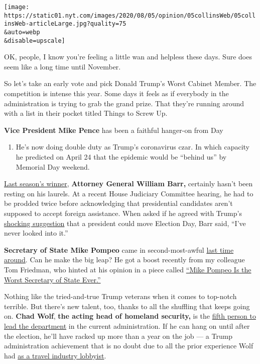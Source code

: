 \texttt{[image: https://static01.nyt.com/images/2020/08/05/opinion/05collinsWeb/05collinsWeb-articleLarge.jpg?quality=75\\\&auto=webp\\\&disable=upscale]}

OK, people, I know you're feeling a little wan and helpless these days.
Sure does seem like a long time until November.

So let's take an early vote and pick Donald Trump's Worst Cabinet
Member. The competition is intense this year. Some days it feels as if
everybody in the administration is trying to grab the grand prize. That
they're running around with a list in their pocket titled Things to
Screw Up.

\textbf{Vice President} \textbf{Mike Pence} has been a faithful
hanger-on from Day

\begin{enumerate}
\def\labelenumi{\arabic{enumi}.}
\tightlist
\item
  He's now doing double duty as Trump's coronavirus czar. In which
  capacity he predicted on April 24 that the epidemic would be ``behind
  us'' by Memorial Day weekend.
\end{enumerate}

\href{https://www.nytimes.com/2019/10/30/opinion/trump-cabinet-worst.html}{Last
season's winner}, \textbf{Attorney General William Barr,} certainly
hasn't been resting on his laurels. At a recent House Judiciary
Committee hearing, he had to be prodded twice before acknowledging that
presidential candidates aren't supposed to accept foreign assistance.
When asked if he agreed with Trump's
\href{https://www.nytimes.com/2020/07/30/us/elections/biden-vs-trump.html}{shocking
suggestion} that a president could move Election Day, Barr said, ``I've
never looked into it.''

\textbf{Secretary of State Mike Pompeo} came in second-most-awful
\href{https://www.nytimes.com/2019/10/30/opinion/trump-cabinet-worst.html}{last
time around}. Can he make the big leap? He got a boost recently from my
colleague Tom Friedman, who hinted at his opinion in a piece called
\href{https://www.nytimes.com/2020/05/26/opinion/mike-pompeo.html}{``Mike
Pompeo Is the Worst Secretary of State Ever.''}

Nothing like the tried-and-true Trump veterans when it comes to
top-notch terrible. But there's new talent, too, thanks to all the
shuffling that keeps going on. \textbf{Chad Wolf}, \textbf{the acting
head of homeland security,} is the
\href{https://www.nytimes.com/interactive/2018/03/16/us/politics/all-the-major-firings-and-resignations-in-trump-administration.html}{fifth
person to lead the department} in the current administration. If he can
hang on until after the election, he'll have racked up more than a year
on the job --- a Trump administration achievement that is no doubt due
to all the prior experience Wolf had
\href{https://www.washingtonpost.com/national/how-chad-wolf-became-trumps-favorite-dhs-chief/2020/08/01/221604ec-d45c-11ea-9038-af089b63ac21_story.html}{as
a travel industry lobbyist}.

